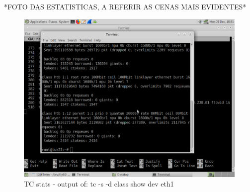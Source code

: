 \documentclass{article}
\begin{document}
*FOTO DAS ESTATISTICAS, A REFERIR AS CENAS MAIS EVIDENTES*
\begin{figure}[h!]
    \centering
    \includegraphics[width=0.9\linewidth,keepaspectratio]{TCStats}
    \caption{TC stats - output of: tc -s -d class show dev eth1}
    \label{fig:TCStats}
\end{figure}
\FloatBarrier
\end{document}
